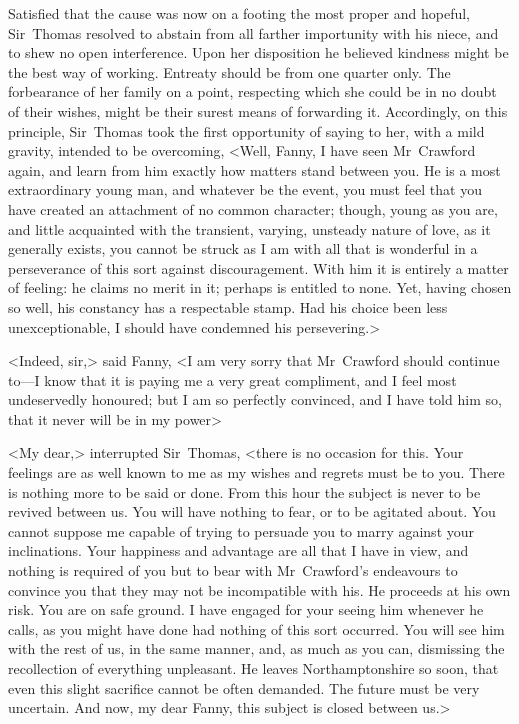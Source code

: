 Satisfied that the cause was now on a footing the most proper and hopeful, Sir~Thomas resolved to abstain from all farther importunity with his niece, and to shew no open interference. Upon her disposition he believed kindness might be the best way of working. Entreaty should be from one quarter only. The forbearance of her family on a point, respecting which she could be in no doubt of their wishes, might be their surest means of forwarding it. Accordingly, on this principle, Sir~Thomas took the first opportunity of saying to her, with a mild gravity, intended to be overcoming, <Well, Fanny, I have seen Mr~Crawford again, and learn from him exactly how matters stand between you. He is a most extraordinary young man, and whatever be the event, you must feel that you have created an attachment of no common character; though, young as you are, and little acquainted with the transient, varying, unsteady nature of love, as it generally exists, you cannot be struck as I am with all that is wonderful in a perseverance of this sort against discouragement. With him it is entirely a matter of feeling: he claims no merit in it; perhaps is entitled to none. Yet, having chosen so well, his constancy has a respectable stamp. Had his choice been less unexceptionable, I should have condemned his persevering.>

<Indeed, sir,> said Fanny, <I am very sorry that Mr~Crawford should continue to—I know that it is paying me a very great compliment, and I feel most undeservedly honoured; but I am so perfectly convinced, and I have told him so, that it never will be in my power\longdash>

<My dear,> interrupted Sir~Thomas, <there is no occasion for this. Your feelings are as well known to me as my wishes and regrets must be to you. There is nothing more to be said or done. From this hour the subject is never to be revived between us. You will have nothing to fear, or to be agitated about. You cannot suppose me capable of trying to persuade you to marry against your inclinations. Your happiness and advantage are all that I have in view, and nothing is required of you but to bear with Mr~Crawford's endeavours to convince you that they may not be incompatible with his. He proceeds at his own risk. You are on safe ground. I have engaged for your seeing him whenever he calls, as you might have done had nothing of this sort occurred. You will see him with the rest of us, in the same manner, and, as much as you can, dismissing the recollection of everything unpleasant. He leaves Northamptonshire so soon, that even this slight sacrifice cannot be often demanded. The future must be very uncertain. And now, my dear Fanny, this subject is closed between us.>

